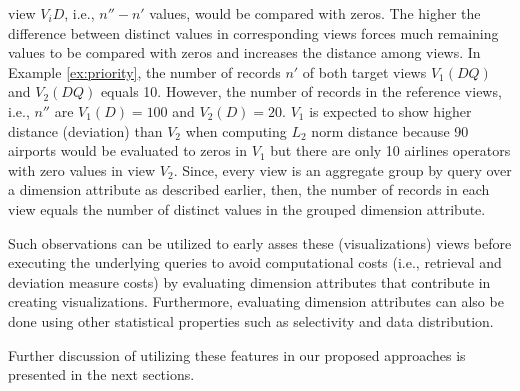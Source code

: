 view $V_{i}D$, i.e., $n'' - n'$ values, would be compared with zeros.
%
The higher the difference between distinct values in corresponding views forces much remaining values 
to be compared with zeros and increases the distance among views.
%
In Example \ref{ex:priority}, the number of records $n'$ of both target views 
$V_1(DQ)$ and $V_2(DQ)$ equals 10. 
%
However, the number of records in the reference views, i.e., $n''$ are $V_1(D) = 100$ and $V_2(D) = 20$.  
%
$V_1$ is expected to show higher distance (deviation) than $V_2$ when computing 
$L_2$ norm distance because 90 airports would be evaluated to zeros in $V_1$ but there are only 10 airlines operators with zero values in view 
$V_2$. 
%
Since, every view is an aggregate group by query over a dimension attribute as described earlier, then, the number of records in 
each view equals the number of distinct values in the grouped dimension attribute.
%

Such observations can be utilized to early asses these (visualizations) views before executing the underlying queries to avoid computational costs (i.e., retrieval and deviation measure costs) by evaluating dimension attributes that contribute in creating visualizations.
%
Furthermore, evaluating dimension attributes can also be done using other statistical properties such as selectivity and data distribution.
%

Further discussion of utilizing these features in our proposed approaches is presented in the next sections.
%


